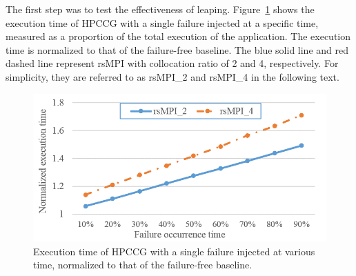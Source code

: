 The first step was to test the effectiveness of leaping. %
Figure~\ref{fig:single_failure} shows the execution time of HPCCG with a single failure injected at a specific time, measured as a proportion of the total execution of the application. %
The execution time is normalized to that of the failure-free baseline.   
The blue solid line and red dashed line represent rsMPI with collocation ratio of 2 and 4, respectively. For simplicity, they are referred to as rsMPI\_2 and rsMPI\_4 in the following text.  

\begin{figure}[!t]
  \begin{center}
      \includegraphics[width=0.9\columnwidth]{Figures/single_failure_hpcc}
  \end{center}
  \vskip -0.2in
  \caption{Execution time of HPCCG with a single failure injected at various time, normalized to that of the failure-free baseline.}
  \label{fig:single_failure}
\vspace{-0.25in}
\end{figure}

